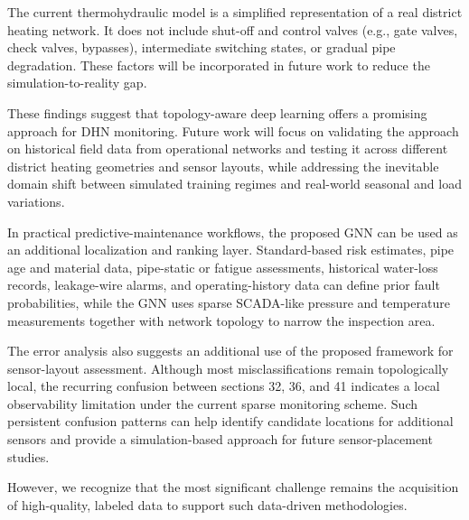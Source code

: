 \documentclass[energies,article,submit,pdftex,moreauthors]{Definitions/mdpi}
\newif\ifshowrevisions
\newcommand{\revisionstyle}[1]{\textcolor{blue}{#1}}
\newcommand{\revision}[1]{\ifshowrevisions\revisionstyle{#1}\else#1\fi}
\begin{document}
The current thermohydraulic model is a simplified representation of a real district heating network. It does not include shut-off and control valves (e.g., gate valves, check valves, bypasses), intermediate switching states, or gradual pipe degradation. These factors will be incorporated in future work to reduce the simulation-to-reality gap.

These findings suggest that topology-aware deep learning offers a promising
approach for DHN monitoring. Future work will focus on validating the approach
on historical field data from operational networks and testing it across
different district heating geometries and sensor layouts, while addressing the
inevitable domain shift between simulated training regimes and real-world
seasonal and load variations.

In practical predictive-maintenance workflows, the proposed
GNN can be used as an additional localization and ranking layer.
Standard-based risk estimates, pipe age and material data, pipe-static or
fatigue assessments, historical water-loss records, leakage-wire alarms, and
operating-history data can define prior fault probabilities, while the GNN uses
sparse SCADA-like pressure and temperature measurements together with network
topology to narrow the inspection area.

The error analysis also suggests an additional use of the proposed framework for sensor-layout assessment. Although most misclassifications remain topologically local, the recurring confusion between sections 32, 36, and 41 indicates a local observability limitation under the current sparse monitoring scheme. Such persistent confusion patterns can help identify candidate locations for additional sensors and provide a simulation-based approach for future sensor-placement studies.

However, we recognize that the most significant challenge remains the
acquisition of high-quality, labeled data to support such data-driven
methodologies.



\end{document}
